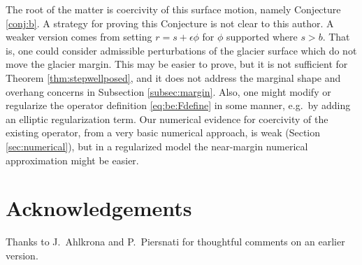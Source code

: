 \documentclass[hidelinks,onefignum,onetabnum,final]{siamart220329}  %
\newcommand{\eps}{\epsilon}
\begin{document}
The root of the matter is coercivity of this surface motion, namely Conjecture \ref{conj:b}.  A strategy for proving this Conjecture is not clear to this author.  A weaker version comes from setting $r=s + \eps\phi$ for $\phi$ supported where $s>b$.  That is, one could consider admissible perturbations of the glacier surface which do not move the glacier margin.  This may be easier to prove, but it is not sufficient for Theorem \ref{thm:stepwellposed}, and it does not address the marginal shape and overhang concerns in Subsection \ref{subsec:margin}.  Also, one might modify or regularize the operator definition \eqref{eq:be:Fdefine} in some manner, e.g.~by adding an elliptic regularization term.  Our numerical evidence for coercivity of the existing operator, from a very basic numerical approach, is weak (Section \ref{sec:numerical}), but in a regularized model the near-margin numerical approximation might be easier.


\section{Acknowledgements} \label{sec:acknowledgements}

Thanks to J.~Ahlkrona and P.~Piersnati for thoughtful comments on an earlier version.



\end{document}
